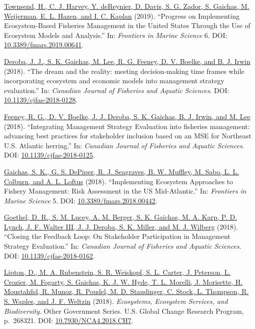 \documentclass[11pt, a4paper]{awesome-cv}
\begin{document}
\protect\hyperlink{cite-townsend_progress_2019}{Townsend, H., C. J.
Harvey, Y. deReynier, D. Davis, S. G. Zador, S. Gaichas, M. Weijerman,
E. L. Hazen, and I. C. Kaplan} (2019). ``Progress on Implementing
Ecosystem-Based Fisheries Management in the United States Through the
Use of Ecosystem Models and Analysis.'' In: \emph{Frontiers in Marine
Science} 6. DOI:
\href{https://doi.org/10.3389\%2Ffmars.2019.00641}{10.3389/fmars.2019.00641}.

\protect\hyperlink{cite-deroba_dream_2018}{Deroba, J. J., S. K. Gaichas,
M. Lee, R. G. Feeney, D. V. Boelke, and B. J. Irwin} (2018). ``The dream
and the reality: meeting decision-making time frames while incorporating
ecosystem and economic models into management strategy evaluation.'' In:
\emph{Canadian Journal of Fisheries and Aquatic Sciences}. DOI:
\href{https://doi.org/10.1139\%2Fcjfas-2018-0128}{10.1139/cjfas-2018-0128}.

\protect\hyperlink{cite-feeney_integrating_2018}{Feeney, R. G., D. V.
Boelke, J. J. Deroba, S. K. Gaichas, B. J. Irwin, and M. Lee} (2018).
``Integrating Management Strategy Evaluation into fisheries management:
advancing best practices for stakeholder inclusion based on an MSE for
Northeast U.S. Atlantic herring.'' In: \emph{Canadian Journal of
Fisheries and Aquatic Sciences}. DOI:
\href{https://doi.org/10.1139\%2Fcjfas-2018-0125}{10.1139/cjfas-2018-0125}.

\protect\hyperlink{cite-gaichas_implementing_2018}{Gaichas, S. K., G. S.
DePiper, R. J. Seagraves, B. W. Muffley, M. Sabo, L. L. Colburn, and A.
L. Loftus} (2018). ``Implementing Ecosystem Approaches to Fishery
Management: Risk Assessment in the US Mid-Atlantic.'' In:
\emph{Frontiers in Marine Science} 5. DOI:
\href{https://doi.org/10.3389\%2Ffmars.2018.00442}{10.3389/fmars.2018.00442}.

\protect\hyperlink{cite-goethel_closing_2018}{Goethel, D. R., S. M.
Lucey, A. M. Berger, S. K. Gaichas, M. A. Karp, P. D. Lynch, J. F.
Walter III, J. J. Deroba, S. K. Miller, and M. J. Wilberg} (2018).
``Closing the Feedback Loop: On Stakeholder Participation in Management
Strategy Evaluation.'' In: \emph{Canadian Journal of Fisheries and
Aquatic Sciences}. DOI:
\href{https://doi.org/10.1139\%2Fcjfas-2018-0162}{10.1139/cjfas-2018-0162}.

\protect\hyperlink{cite-lipton_ecosystems_2018}{Lipton, D., M. A.
Rubenstein, S. R. Weiskopf, S. L. Carter, J. Peterson, L. Crozier, M.
Fogarty, S. Gaichas, K. J. W. Hyde, T. L. Morelli, J. Morisette, H.
Moustahfid, R. Munoz, R. Poudel, M. D. Staudinger, C. Stock, L.
Thompson, R. S. Waples, and J. F. Weltzin} (2018). \emph{Ecosystems,
Ecosystem Services, and Biodiversity}. Other Government Series. U.S.
Global Change Research Program, p.~268321. DOI:
\href{https://doi.org/10.7930\%2FNCA4.2018.CH7}{10.7930/NCA4.2018.CH7}.
\end{document}
